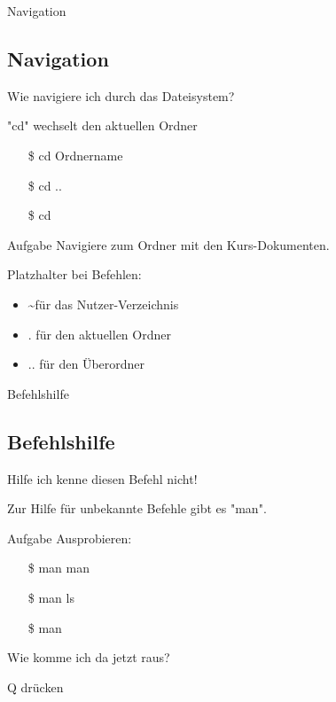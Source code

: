 \begin{frame}{Navigation}
    \subsection{Navigation}\label{subsec:navigation}

    Wie navigiere ich durch das Dateisystem?
    \pause

    \textrightarrow "cd" wechselt den aktuellen Ordner
    \pause

    \begin{itemize}
        \item[\$] cd Ordnername\pause
        \item[\$] cd ..\pause
        \item[\$] cd
    \end{itemize}
    \pause

    \vspace{0.5cm}
    \begin{alertblock}{Aufgabe}
        Navigiere zum Ordner mit den Kurs-Dokumenten.
    \end{alertblock}
    \pause

    Platzhalter bei Befehlen:

    \begin{itemize}
        \item \textasciitilde\space für das Nutzer-Verzeichnis\pause
        \item . für den aktuellen Ordner\pause
        \item .. für den Überordner
    \end{itemize}

\end{frame}

\begin{frame}{Befehlshilfe}
    \subsection{Befehlshilfe}\label{subsec:befehlshilfe}

    Hilfe ich kenne diesen Befehl nicht!
    \pause

    \textrightarrow Zur Hilfe für unbekannte Befehle gibt es "man".
    \pause

    \vspace{0.5cm}
    \begin{alertblock}{Aufgabe}
        Ausprobieren:

        \begin{itemize}
            \item[\$] man man\pause
            \item[\$] man ls\pause
            \item[\$] man
        \end{itemize}
    \end{alertblock}
    \pause

    Wie komme ich da jetzt raus?
    \pause

    \textrightarrow Q drücken

\end{frame}

